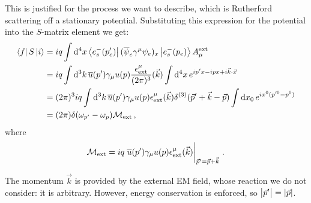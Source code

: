 \documentclass[main.tex]{subfiles}
\begin{document}
This is justified for the process we want to describe, which is Rutherford scattering off a stationary potential.  
Substituting this expression for the potential into the \(S\)-matrix element we get: 
%
\begin{align}
\bra{f} S \ket{i} &= i q \int \dd[4]{x}
\bra{e^{-}_{s} (p'_e)} 
(\overline{\psi}_{e} \gamma^{\mu} \psi_{e})_x 
\ket{e^{-}_{s}(p_e)}
A_{\mu }^{\text{ext}}  \\
&= iq \int \dd[3]{k} \overline{u} (p') \gamma_{\mu } u(p) \frac{\epsilon^{\mu }_{\text{ext}}}{(2 \pi )^3} (\vec{k}) \int  \dd[4]{x} e^{ip'x - i px + i \vec{k} \cdot \vec{x}}  \\
&= (2\pi)^3 iq \int \dd[3]{k} \overline{u} (p') \gamma_{\mu } u(p) \epsilon^{\mu }_{\text{ext}} (\vec{k}) \delta^{(3)} (\vec{p}' + \vec{k} - \vec{p})
\int \dd{x_0 } e^{ix^{0} (p^{\prime 0} - p^{0})}  \\
&= (2 \pi ) \delta(\omega_{p'} - \omega_{p}) \mathcal{M} _{\text{ext}}
\,,
\end{align}
%
where 
%
\begin{align}
\mathcal{M} _{\text{ext}} = i q \eval{\overline{u} (p') \gamma_{\mu } u(p) \epsilon^{\mu }_{\text{ext}} (\vec{k}) }_{\vec{p}' = \vec{p} + \vec{k}}
\,.
\end{align}
%

The momentum \(\vec{k}\) is provided by the external EM field, whose reaction we do not consider: it is arbitrary. However, energy conservation is enforced, so \(\abs{\vec{p}'} = \abs{\vec{p}}\). 

\end{document}
